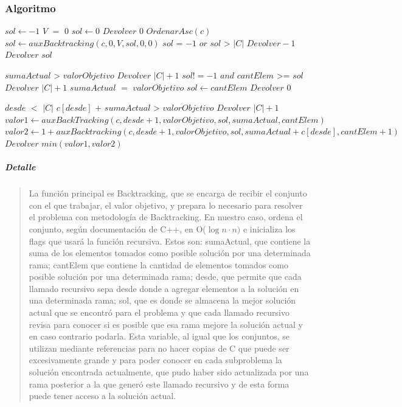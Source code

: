 \documentclass[8pt,a4paper]{article}
\begin{document}
\subsubsection{Algoritmo}



\begin{codebox}
  \li $sol \gets -1$ \li 
  \If $V$ $=$ $0$ \Then \li 
  	$sol \gets 0 $ \li 
  	$Devolver$ $0$
  \End 
  \li $OrdenarAsc(c)$
  $sol \gets auxBacktracking(c,0,V,sol,0,0)$
\li \If $sol$ = $-1$ $or$ $sol$ > $|C|$ \Then
\li 	$Devolver -1$\li 
\Else \li 
		$Devolver$ $sol$
	\End
  	\End
\end{codebox}

\begin{codebox}
\li 	\If $sumaActual$ > $valorObjetivo$ \Then 
		\li $Devolver$ $|C|+1$ 
		\End
	\li \If $sol!=-1$ $and$ $cantElem$ >= $sol$ \Then
		\li $Devolver$ $|C|+1$
  		\End
  	\li \If $sumaActual$ $=$ $valorObjetivo$ \Then
  	\li $sol \gets cantElem$
  	\li $Devolver$ $0$ 
  	\End
  	
  	\li \If $desde$ $<$ $|C|$ \Then
  	\li \If $c[desde]$ $+$ $sumaActual$ > $valorObjetivo$ \Then
  	\li $Devolver$ $|C|+1$ \li
  	\Else \li$valor1 \gets auxBackTracking(c,desde+1,valorObjetivo,sol,sumaActual,cantElem)$
  	\li $valor2 \gets 1+auxBacktracking(c,desde+1,valorObjetivo,sol,sumaActual+c[desde],cantElem+1)$
  	\li $Devolver$ $min(valor1,valor2)$
  	\End
\end{codebox}

\subparagraph{Detalle} 

\begin{verse}
La función principal es Backtracking, que se encarga de recibir el conjunto con el que trabajar, el valor objetivo, y prepara lo necesario para resolver el problema con metodología de Backtracking. En nuestro caso, ordena el conjunto, según documentación de C++, en O($\log{n} \cdot n)$ e inicializa los flags que usará la función recursiva. Estos son: sumaActual, que contiene la suma de los elementos tomados como posible solución por una determinada rama; cantElem que contiene la cantidad de elementos tomados como posible solución por una determinada rama; desde, que permite que cada llamado recursivo sepa desde donde a agregar elementos a la solución en una determinada rama; sol, que es donde se almacena la mejor solución actual que se encontró para el problema y que cada llamado recursivo revisa para conocer si es posible que esa rama mejore la solución actual y en caso contrario podarla. Esta variable, al igual que los conjuntos, se utilizan mediante referencias para no hacer copias de C que puede ser excesivamente grande y para poder conocer en cada subproblema la solución encontrada actualmente, que pudo haber sido actualizada por una rama posterior a la que generó este llamado recursivo y de esta forma puede tener acceso a la solución actual.
\end{verse}
\end{document}

